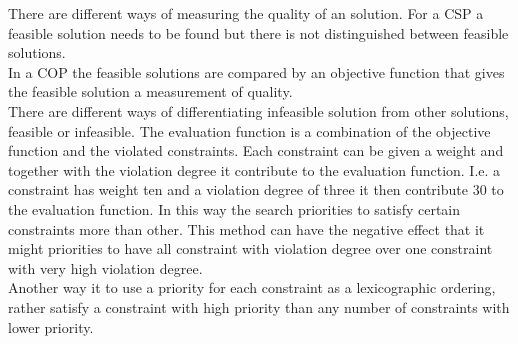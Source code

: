 There are different ways of measuring the quality of an solution. For a CSP a feasible solution needs to be found but 
there is not distinguished between feasible solutions.  \\
In a COP the feasible solutions are compared by an objective function that gives the feasible solution a measurement 
of quality. \\ 
There are different ways of differentiating infeasible solution from other solutions, feasible or infeasible. The 
evaluation function is a combination of the objective function and the violated constraints. Each constraint can be 
given a weight and together with the violation degree it contribute to the evaluation function. I.e. a constraint has 
weight ten and a violation degree of three it then contribute 30 to the evaluation function. In this way the search 
priorities to satisfy certain constraints more than other. This method can have the negative effect that it might 
priorities to have all constraint with violation degree over one constraint with very high violation degree. \\ 
Another way it to use a priority for each constraint as a lexicographic ordering, rather satisfy a constraint with high 
priority than any number of constraints with lower priority. 